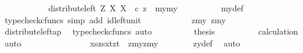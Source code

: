 \begin{isabellebody}
\ \ \ \ \ \ \isamarkupfalse%
\ \isamarkupfalse%
\ {\isachardoublequoteopen}{\isachardot}{\kern0pt}{\isachardot}{\kern0pt}{\isachardot}{\kern0pt}\ {\isacharequal}{\kern0pt}\ distribute{\isacharunderscore}{\kern0pt}left\ Z\ X\ X\ \ {\isasymcirc}\isactrlsub c\ {\isasymlangle}z\ {\isacharcomma}{\kern0pt}\ {\isasymlangle}my{}{\isacharcomma}{\kern0pt}my{}{\isasymrangle}{\isasymrangle}{\isachardoublequoteclose}\isanewline
\ \ \ \ \ \ \ \ \isamarkupfalse%
\ my{\isacharunderscore}{\kern0pt}def\ \isamarkupfalse%
\ {\isacharparenleft}{\kern0pt}typecheck{\isacharunderscore}{\kern0pt}cfuncs{\isacharcomma}{\kern0pt}\ simp\ add{\isacharcolon}{\kern0pt}\ id{\isacharunderscore}{\kern0pt}left{\isacharunderscore}{\kern0pt}unit{}{\isacharparenright}{\kern0pt}\isanewline
\ \ \ \ \ \ \isamarkupfalse%
\ \isamarkupfalse%
\ {\isachardoublequoteopen}{\isachardot}{\kern0pt}{\isachardot}{\kern0pt}{\isachardot}{\kern0pt}\ {\isacharequal}{\kern0pt}\ {\isasymlangle}{\isasymlangle}z{\isacharcomma}{\kern0pt}my{}{\isasymrangle}{\isacharcomma}{\kern0pt}\ {\isasymlangle}z{\isacharcomma}{\kern0pt}my{}{\isasymrangle}{\isasymrangle}{\isachardoublequoteclose}\isanewline
\ \ \ \ \ \ \ \ \isamarkupfalse%
\ distribute{\isacharunderscore}{\kern0pt}left{\isacharunderscore}{\kern0pt}ap\ \isamarkupfalse%
\ {\isacharparenleft}{\kern0pt}typecheck{\isacharunderscore}{\kern0pt}cfuncs{\isacharcomma}{\kern0pt}\ auto{\isacharparenright}{\kern0pt}\isanewline
\ \ \ \ \ \ \isamarkupfalse%
\ \isamarkupfalse%
\ {\isacharquery}{\kern0pt}thesis\isanewline
\ \ \ \ \ \ \ \ \isamarkupfalse%
\ calculation\ \isamarkupfalse%
\ auto\isanewline
\ \ \ \ \isamarkupfalse%
\ \ \ \isanewline
\ \ \ \ \isamarkupfalse%
\ \isamarkupfalse%
\ {\isachardoublequoteopen}{\isasymlangle}{\isasymlangle}xs{\isacharcomma}{\kern0pt}zs{\isasymrangle}{\isacharcomma}{\kern0pt}{\isasymlangle}xt{\isacharcomma}{\kern0pt}zt{\isasymrangle}{\isasymrangle}\ {\isacharequal}{\kern0pt}\ {\isasymlangle}{\isasymlangle}z{\isacharcomma}{\kern0pt}my{}{\isasymrangle}{\isacharcomma}{\kern0pt}{\isasymlangle}z{\isacharcomma}{\kern0pt}my{}{\isasymrangle}{\isasymrangle}{\isachardoublequoteclose}\isanewline
\ \ \ \ \ \ \isamarkupfalse%
\ zy{\isacharunderscore}{\kern0pt}def\ \isamarkupfalse%
\ auto\isanewline

\end{isabellebody}
